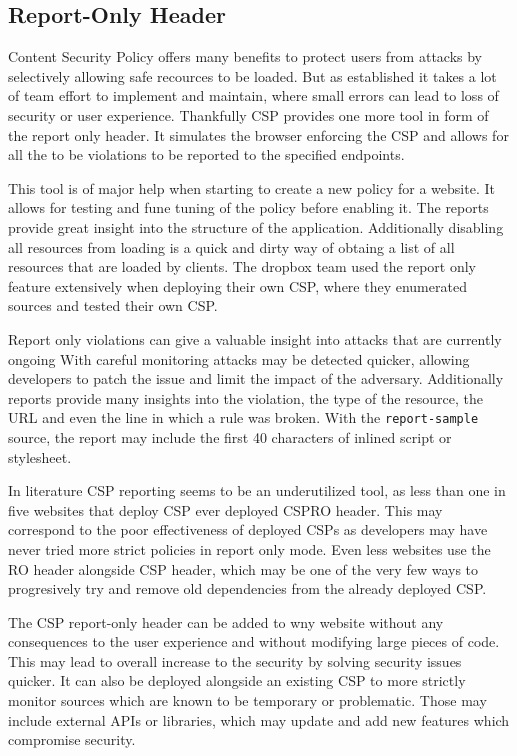 \documentclass[11]{article}   %
\begin{document}
\subsection{Report-Only Header}
Content Security Policy offers many benefits to protect users from attacks by selectively allowing safe recources to be loaded.
But as established it takes a lot of team effort to implement and maintain, where small errors can lead to loss of security or user experience.
Thankfully CSP provides one more tool in form of the report only header.
It simulates the browser enforcing the CSP and allows for all the to be violations to be reported to the specified endpoints.

This tool is of major help when starting to create a new policy for a website.
It allows for testing and fune tuning of the policy before enabling it. 
The reports provide great insight into the structure of the application.
Additionally disabling all resources from loading is a quick and dirty way of obtaing a list of all resources that are loaded by clients.
The dropbox team used the report only feature extensively when deploying their own CSP, where they enumerated sources and tested their own CSP. \cite{dropboxcsp}


Report only violations can give a valuable insight into attacks that are currently ongoing 
With careful monitoring attacks may be detected quicker, allowing developers to patch the issue and limit the impact of the adversary.
Additionally reports provide many insights into the violation, the type of the resource, the URL and even the line in which a rule was broken.
With the \texttt{report-sample} source, the report may include the first 40 characters of inlined script or stylesheet.

In literature CSP reporting seems to be an underutilized tool, as less than one in five websites that deploy CSP ever deployed CSPRO header. \cite{osti_10173479}
This may correspond to the poor effectiveness of deployed CSPs as developers may have never tried more strict policies in report only mode.
Even less websites use the RO header alongside CSP header, which may be one of the very few ways to progresively try and remove old dependencies from the already deployed CSP.

The CSP report-only header can be added to wny website without any consequences to the user experience and without modifying large pieces of code.
This may lead to overall increase to the security by solving security issues quicker.
It can also be deployed alongside an existing CSP to more strictly monitor sources which are known to be temporary or problematic.
Those may include external APIs or libraries, which may update and add new features which compromise security.

\printbibliography
\end{document}
